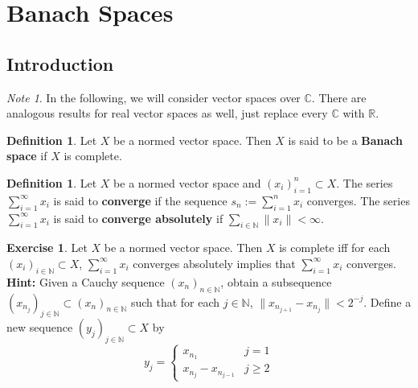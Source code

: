\documentclass[12pt]{amsart}
\theoremstyle{definition}
\newtheorem{defn}[definition]{Definition}
\theoremstyle{remark}
\newtheorem{note}[remark]{Note}
\theoremstyle{definition}
\newtheorem{ex}[definition]{Exercise}
\newcommand{\C}{\mathbb{C}}
\newcommand{\N}{\mathbb{N}}
\newcommand{\R}{\mathbb{R}}
\newcommand{\seq}[2]{(#1_{#2})_{#2 \in \N}}
\begin{document}
	
	
	
	
	
	
	
	\newpage
	
	
	
	
	
	
	
	
	
	
	
	
	
	
	
	
	
	
	
	
	
	
	
	
	
	
	\section{Banach Spaces}
	\subsection{Introduction}
	\begin{note}
		In the following, we will consider vector spaces over $\C$. There are analogous results for real vector spaces as well, just replace every $\C$ with $\R$.
	\end{note}
	
	\begin{defn}
		Let $X$ be a normed vector space. Then $X$ is said to be a \textbf{Banach space} if $X$ is complete.  
	\end{defn}
	
	\begin{defn}
		Let $X$ be a normed vector space and $(x_i)_{i=1}^n \subset X$. The series $\sum_{i =1}^{\infty}x_i$ is said to \textbf{converge} if the sequence $s_n := \sum_{i=1}^n x_i$ converges. The series $\sum_{i =1}^{\infty}x_i$ is said to \textbf{converge absolutely} if $\sum_{i\in \N}\|x_i \|< \infty$.
	\end{defn}
	
	\begin{ex}
		Let $X$ be a normed vector space. Then $X$ is complete iff for each $\seq{x}{i} \subset X$, $\sum_{i =1}^{\infty}x_i$ converges absolutely implies that $\sum_{i=1}^{\infty}x_i$ converges. \\
		\textbf{Hint:} Given a Cauchy sequence $(x_n)_{n \in \N}$, obtain a subsequence $(x_{n_j})_{j \in \N} \subset (x_n)_{n \in \N}$ such that for each $j \in \N$, $\|x_{n_{j+1}} - x_{n_{j}}\| < 2^{-j}$. Define a new sequence $(y_j)_{j \in \N} \subset X$ by 
		\[
		y_j = 
		\begin{cases}
		x_{n_1} & j =1 \\  
		x_{n_j} - x_{n_{j-1}} & j \geq 2	
		\end{cases}
		\] 
	\end{ex}
	
\end{document}
